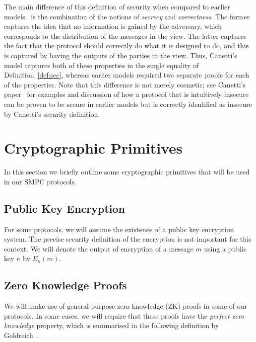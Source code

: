 \documentclass{article}
\theoremstyle{remark}
\begin{document}
The main difference of this definition of security when compared to earlier
models~\cite{gmr89,mr92,b92} is the combination of the notions of
\textit{secrecy} and \textit{correctness}. The former captures the idea that no
information is gained by the adversary, which corresponds to the distribution
of the messages in the view. The latter captures the fact that the protocol
should correctly do what it is designed to do, and this is captured by having
the outputs of the parties in the view. Thus, Canetti's model captures both of
these properties in the single equality of Definition~\ref{def:sec}, whereas
earlier models required two separate proofs for each of the properties. Note
that this difference is not merely cosmetic; see Canetti's paper~\cite{c00} for
examples and discussion of how a protocol that is intuitively insecure can be
proven to be secure in earlier models but is correctly identified as insecure
by Canetti's security definition.

\section{Cryptographic Primitives}

In this section we briefly outline some cryptographic primitives that will be
used in our SMPC protocols.

\subsection{Public Key Encryption}

\newcommand{\encrypt}[2]{E_{#1}\left(#2\right)}

For some protocols, we will assume the existence of a public key encryption
system. The precise security definition of the encryption is not important for
this context. We will denote the output of encryption of a message $m$ using a
public key $\kappa$ by $\encrypt{\kappa}{m}$.

\subsection{Zero Knowledge Proofs}

We will make use of general purpose zero knowledge (ZK) proofs in some of our
protocols. In some cases, we will require that these proofs have the
\textit{perfect zero knowledge} property, which is summarised in the following
definition by Goldreich~\cite{goldreich_2001}.
\end{document}
